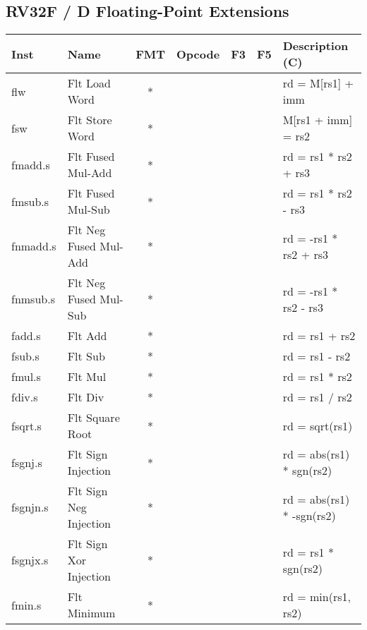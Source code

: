 \subsection*{RV32F / D Floating-Point Extensions}

\begin{center}
\begin{tabular}
{T | l | c | T | T | T | T } \hline
\rm Inst  & Name                  & FMT   & \rm Opcode & \rm F3 & \rm F5 & \rm Description (C)         \\ \hline
flw       & Flt Load Word         & *     &            &        &        & rd = M[rs1] + imm    \\
fsw       & Flt Store Word        & *     &            &        &        & M[rs1 + imm] = rs2   \\
fmadd.s   & Flt Fused Mul-Add     & *     &            &        &        & rd = rs1 * rs2 + rs3 \\
fmsub.s   & Flt Fused Mul-Sub     & *     &            &        &        & rd = rs1 * rs2 - rs3 \\
fnmadd.s  & Flt Neg Fused Mul-Add & *     &            &        &        & rd = -rs1 * rs2 + rs3 \\
fnmsub.s  & Flt Neg Fused Mul-Sub & *     &            &        &        & rd = -rs1 * rs2 - rs3 \\
fadd.s    & Flt Add               & *     &            &        &        & rd = rs1 + rs2       \\
fsub.s    & Flt Sub               & *     &            &        &        & rd = rs1 - rs2       \\
fmul.s    & Flt Mul               & *     &            &        &        & rd = rs1 * rs2       \\
fdiv.s    & Flt Div               & *     &            &        &        & rd = rs1 / rs2       \\
fsqrt.s   & Flt Square Root       & *     &            &        &        & rd = sqrt(rs1)       \\
fsgnj.s   & Flt Sign Injection    & *     &            &        &        & rd = abs(rs1) * sgn(rs2) \\
fsgnjn.s  & Flt Sign Neg Injection& *     &            &        &        & rd = abs(rs1) * -sgn(rs2) \\
fsgnjx.s  & Flt Sign Xor Injection& *     &            &        &        & rd = rs1 * sgn(rs2)  \\
fmin.s    & Flt Minimum           & *     &            &        &        & rd = min(rs1, rs2)   \\

\end{tabular}
\end{center}
